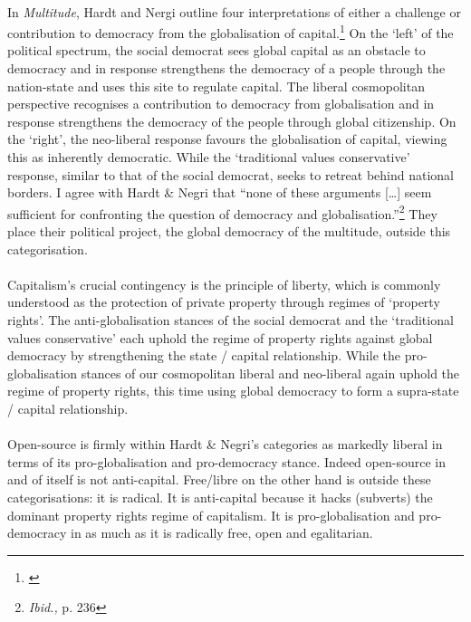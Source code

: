 \paragraph{}In \textit{Multitude}, Hardt and Nergi outline four interpretations of either a challenge or contribution to democracy from the globalisation of capital.\footnote{\cite[pp. 232-236]{Hardt:2005zt}} On the `left' of the political spectrum, the social democrat sees global capital as an obstacle to democracy and in response strengthens the democracy of a people through the nation-state and uses this site to regulate capital. The liberal cosmopolitan perspective recognises a contribution to democracy from globalisation and in response strengthens the democracy of the people through global citizenship. On the `right', the neo-liberal response favours the globalisation of capital, viewing this as inherently democratic. While the `traditional values conservative' response, similar to that of the social democrat, seeks to retreat behind national borders. I agree with Hardt \& Negri that ``none of these arguments [\ldots] seem sufficient for confronting the question of democracy and globalisation.''\footnote{\textit{Ibid.,} p. 236} They place their political project, the global democracy of the multitude, outside this categorisation.

\paragraph{}Capitalism's crucial contingency is the principle of liberty, which is commonly understood as the protection of private property through regimes of `property rights'. The anti-globalisation stances of the social democrat and the `traditional values conservative' each uphold the regime of property rights against global democracy by strengthening the state / capital relationship. While the pro-globalisation stances of our cosmopolitan liberal and neo-liberal again uphold the regime of property rights, this time using global democracy to form a supra-state / capital relationship.

\paragraph{}Open-source is firmly within Hardt \& Negri's categories as markedly liberal in terms of its pro-globalisation and pro-democracy stance. Indeed open-source in and of itself is not anti-capital. Free/libre on the other hand is outside these categorisations: it is radical. It is anti-capital because it hacks (subverts) the dominant property rights regime of capitalism. It is pro-globalisation and pro-democracy in as much as it is radically free, open and egalitarian.

